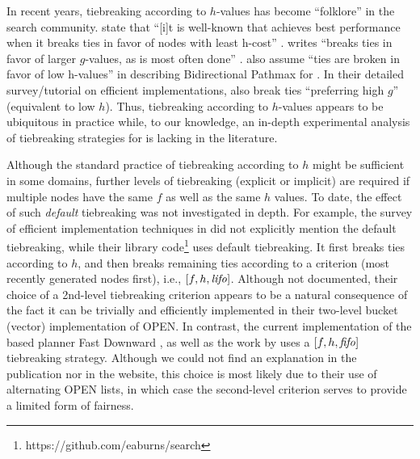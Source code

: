In recent years, tiebreaking according to $h$-values has become ``folklore'' in the search community.
\citeauthor{hansen2007anytime} state that ``[i]t is well-known 
that \astar achieves best performance when it breaks ties
in favor of nodes with least h-cost'' \cite{hansen2007anytime}.
\citeauthor{holte2010common} writes ``\astar breaks ties in favor
of larger $g$-values, as is most often done'' \cite[note that since $f=g+h$,
preferring large $g$ is equivalent to preferring smaller $h$]{holte2010common}.
 also assume ``ties are broken in
favor of low h-values'' in describing Bidirectional Pathmax for \astar \citeyear{felner2011inconsistent}.
In their detailed survey/tutorial on efficient \astar implementations,
 \citeyear{burns2012implementing}
also break ties ``preferring high $g$'' (equivalent to low $h$).
Thus, tiebreaking according to $h$-values appears
to be ubiquitous in practice while,
to our knowledge, an in-depth experimental analysis of tiebreaking strategies for \astar is lacking in the literature.

Although the standard practice of tiebreaking according to $h$ might be
sufficient in some domains, further levels of tiebreaking (explicit or
implicit) are required if multiple nodes have the same $f$ as well as
the same $h$ values. To date, the effect of such \emph{default}
tiebreaking was not investigated in depth.
% 
For example, the survey of efficient \astar implementation techniques in
\cite{burns2012implementing} did not explicitly mention the default
tiebreaking, while their library
code\footnote{https://github.com/eaburns/search} uses \lifo
default tiebreaking.
% 
It first breaks ties according to $h$, and then
breaks remaining ties according to a \lifo criterion (most recently
generated nodes first), i.e., $[f,h,{\text{\textit{lifo}}}]$.
% 
Although not documented, their choice of a \lifo 2nd-level tiebreaking
criterion appears to be a natural consequence of the fact it can be
trivially and efficiently implemented in their two-level bucket (vector)
implementation of OPEN.
% 
In contrast, the current implementation of the \sota \astar based planner Fast
Downward \cite{Helmert2006}, as well as the work by \cite{RogerH10} uses
a $[f,h,{\text{\textit{fifo}}}]$ tiebreaking strategy.
% 
Although we could not find an explanation in the publication nor in the
website, this choice is most likely due to their use of alternating OPEN
lists, in which case the \fifo second-level criterion serves to provide a
limited form of fairness.
% 
